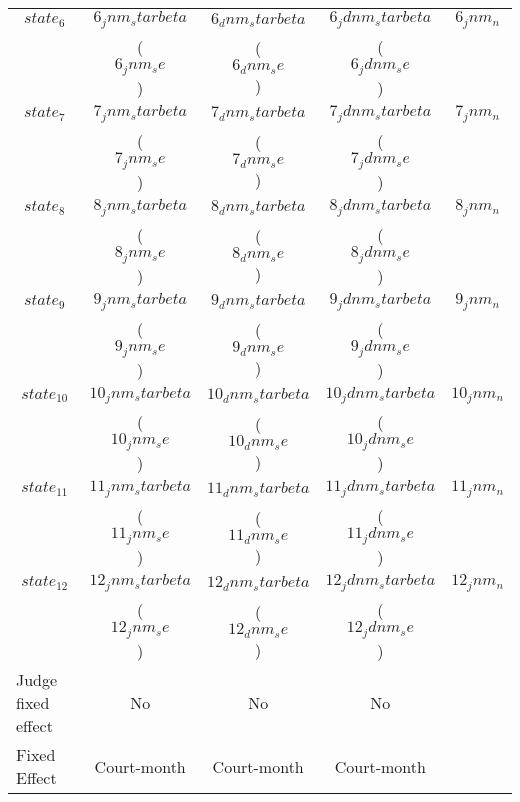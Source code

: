 {\begin{tabular}{l*{4}{c}}
$$state_6$$ \hspace{15mm} & $$6_jnm_starbeta$$ & $$6_dnm_starbeta$$ & $$6_jdnm_starbeta$$ & $$6_jnm_n$$ \\
                          & ($$6_jnm_se$$)     & ($$6_dnm_se$$)     & ($$6_jdnm_se$$)                   \\[2.5mm]
\hline

$$state_7$$ \hspace{15mm} & $$7_jnm_starbeta$$ & $$7_dnm_starbeta$$ & $$7_jdnm_starbeta$$ & $$7_jnm_n$$ \\
                          & ($$7_jnm_se$$)     & ($$7_dnm_se$$)     & ($$7_jdnm_se$$)                   \\[2.5mm]
\hline

$$state_8$$\hspace{15mm} & $$8_jnm_starbeta$$ & $$8_dnm_starbeta$$ & $$8_jdnm_starbeta$$ & $$8_jnm_n$$ \\
                         & ($$8_jnm_se$$)     & ($$8_dnm_se$$)     & ($$8_jdnm_se$$)                   \\[2.5mm]
\hline

$$state_9$$ \hspace{15mm} & $$9_jnm_starbeta$$ & $$9_dnm_starbeta$$ & $$9_jdnm_starbeta$$ & $$9_jnm_n$$ \\
                          & ($$9_jnm_se$$)     & ($$9_dnm_se$$)     & ($$9_jdnm_se$$)                   \\[2.5mm]
\hline

$$state_10$$ \hspace{15mm} & $$10_jnm_starbeta$$ & $$10_dnm_starbeta$$ & $$10_jdnm_starbeta$$ & $$10_jnm_n$$ \\
                           & ($$10_jnm_se$$)     & ($$10_dnm_se$$)     & ($$10_jdnm_se$$)                    \\[2.5mm]
\hline

$$state_11$$ \hspace{15mm} & $$11_jnm_starbeta$$ & $$11_dnm_starbeta$$ & $$11_jdnm_starbeta$$ & $$11_jnm_n$$ \\
                           & ($$11_jnm_se$$)     & ($$11_dnm_se$$)     & ($$11_jdnm_se$$)                    \\[2.5mm]
\hline

$$state_12$$ \hspace{15mm} & $$12_jnm_starbeta$$ & $$12_dnm_starbeta$$ & $$12_jdnm_starbeta$$ & $$12_jnm_n$$ \\
                           & ($$12_jnm_se$$)     & ($$12_dnm_se$$)     & ($$12_jdnm_se$$)                    \\[2.5mm]
\hline

Judge fixed effect & No          & No          & No          \\
Fixed Effect       & Court-month & Court-month & Court-month \\
\hline\hline
\end{tabular}
}
 
